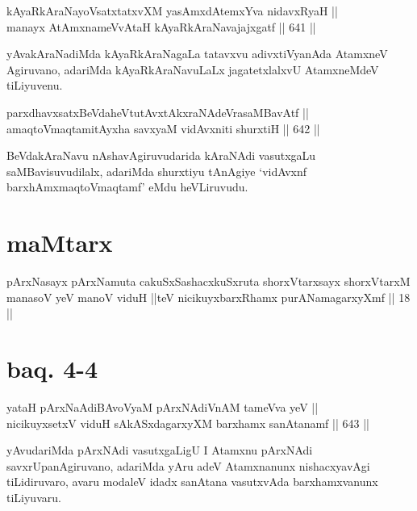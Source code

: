\begin{shl}
kAyaRkAraNayoVsatxtatxvXM yasAmxdAtemxYva nidavxRyaH || \\
manayx AtAmxnameVvAtaH kAyaRkAraNavajajxgatf \hfill || 641 ||  
\end{shl}

\begin{artha}
yAvakAraNadiMda kAyaRkAraNagaLa tatavxvu adivxtiVyanAda AtamxneV
Agiruvano, adariMda kAyaRkAraNavuLaLx jagatetxlalxvU AtamxneMdeV tiLiyuvenu.
\end{artha}


\begin{shl}
parxdhavxsatxBeVdaheVtutAvxtAkxraNAdeVrasaMBavAtf || \\
amaqtoV\s maqtamitAyxha savxyaM vidAvxniti shurxtiH \hfill || 642 ||  
\end{shl}

\begin{artha}
BeVdakAraNavu nAshavAgiruvudarida kAraNAdi vasutxgaLu
saMBavisuvudilalx, adariMda shurxtiyu tAnAgiye `vidAvxnf
barxhAmxmaqtoV\s maqtamf' eMdu heVLiruvudu.
\end{artha}

\section*{maMtarx}

\begin{shl}
pArxNasayx pArxNamuta cakuSxSashacxkuSxruta shorxVtarxsayx shorxVtarxM manasoV yeV manoV viduH ||teV nicikuyxbarxRhamx purANamagarxyXmf || 18 ||
\end{shl}

\section*{baq. 4-4}


\begin{shl}
yataH pArxNaAdiBAvoV\s yaM pArxNAdiVnAM tameVva yeV || \\
nicikuyxsetxV viduH sAkASxdagarxyXM barxhamx sanAtanamf \hfill || 643 ||  
\end{shl}

\begin{artha}
yAvudariMda pArxNAdi vasutxgaLigU I Atamxnu pArxNAdi
savxrUpanAgiruvano, adariMda yAru adeV Atamxnanunx nishacxyavAgi
tiLidiruvaro, avaru modaleV idadx sanAtana vasutxvAda barxhamxvanunx
tiLiyuvaru.
\end{artha}

